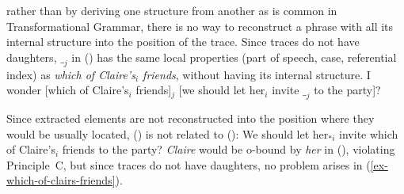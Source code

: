 \documentclass[output=paper,biblatex,babelshorthands,newtxmath,draftmode,colorlinks,citecolor=brown]{langscibook}
\begin{document}
rather than by deriving one structure from another as is common in Transformational Grammar,
there is no way to reconstruct a phrase with all its internal structure into the position of the
trace. Since traces do not have daughters, $\__j$ in () has the same local properties (part
of speech, case, referential index) as \emph{which of Claire's$_i$ friends}, without having its
internal structure. 
\ea
\label{ex-which-of-clairs-friends}
I wonder [which of Claire's$_i$ friends]$_j$ [we should let her$_i$ invite $\__j$ to the party]?
\z
{}

Since extracted elements are not reconstructed into the position where they would be usually
located, () is not related to ():
\ea
We should let her$_{*i}$ invite which of Claire's$_i$ friends to the party?
\z
\emph{Claire} would be o-bound by \emph{her} in (), violating
Principle~C, but since traces do not have daughters, no problem arises in (\ref{ex-which-of-clairs-friends}). 
\end{document}
